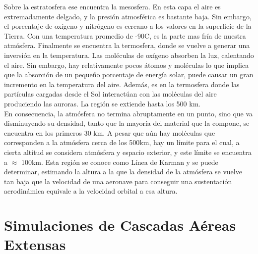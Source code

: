 Sobre la estratosfera ese encuentra la mesosfera. En esta capa el aire es extremadamente delgado, y la presión atmosférica es bastante baja. Sin embargo, el porcentaje de oxígeno y nitrógeno es cercano a los valores en la superficie de la Tierra. Con una temperatura promedio de -90C, es la parte mas fría de nuestra atmósfera. Finalmente se encuentra la termosfera, donde se vuelve a generar una inversión en la temperatura. Las moléculas de oxígeno absorben la luz, calentando el aire. Sin embargo, hay relativamente pocos átomos y moléculas lo que implica que la absorción de un pequeño porcentaje de energía solar, puede causar un gran incremento en la temperatura del aire. Además, es en la termosfera donde las partículas cargadas desde el Sol interactúan con las moléculas del aire produciendo las auroras. La región se extiende hasta los 500 km. \\

En consecuencia, la atmósfera no termina abruptamente en un punto, sino que va disminuyendo su densidad, tanto que la mayoría del material que la compone, se encuentra en los primeros 30 km. A pesar que aún hay moléculas que corresponden a la atmósfera cerca de los 500km, hay un límite para el cual, a cierta altitud se considera atmósfera y espacio exterior, y este límite se encuentra a $\approx$ 100km. Esta región se conoce como Línea de Karman y se puede determinar, estimando la altura a la que la densidad de la atmósfera se vuelve tan baja que la velocidad de una aeronave para conseguir una sustentación aerodinámica equivale a la velocidad orbital a esa altura.\\
\section{Simulaciones de Cascadas Aéreas Extensas}

